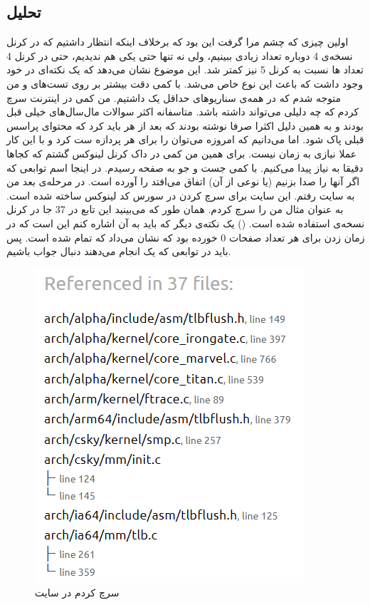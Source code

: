 \subsection{تحلیل}
اولین چیزی که چشم مرا گرفت این بود که برخلاف اینکه انتظار داشتیم که در کرنل نسخه‌ی 4 دوباره تعداد زیادی
ببینیم، ولی نه تنها حتی یکی هم ندیدیم، حتی در کرنل 4 تعداد
ها
نسبت به کرنل 5 نیز کمتر شد. این موضوع نشان می‌دهد که یک نکته‌ای در خود
وجود داشت که باعث این نوع
خاص می‌شد. با کمی دقت بیشتر بر روی تست‌های
 و 
من متوجه شدم که در همه‌ی سناریو‌های
حداقل یک
داشتیم. من کمی در اینترنت سرچ کردم که چه دلیلی می‌تواند داشته باشد. متاسفانه اکثر سوالات مال‌سال‌های
خیلی قبل بودند و به همین دلیل اکثرا صرفا نوشته بودند که بعد از هر
باید
کرد که محتوای پراسس قبلی پاک شود. اما می‌دانیم که امروزه می‌توان
را برای هر پردازه ست کرد و با این کار عملا نیازی به
زمان
نیست. برای همین من کمی در داک کرنل لینوکس گشتم که کجا‌ها دقیقا به
نیاز پیدا می‌کنیم. با کمی جست و جو به
صفحه رسیدم. در اینجا اسم توابعی که اگر آنها را صدا بزنیم
(یا نوعی از آن)
اتفاق می‌افتد را آورده است. در مرحله‌ی بعد من به سایت
رفتم. این سایت برای سرچ کردن در سورس کد لینوکس ساخته شده است. به عنوان مثال من
را سرچ کردم. همان طور که می‌بینید این تابع در 37 جا در کرنل نسخه‌ی
استفاده شده است.
()
یک نکته‌ی دیگر که باید به آن اشاره کنم این است که در زمان زدن
برای هر
تعداد صفحات 0 خورده بود که نشان می‌داد که تمام
شده است. پس باید در توابعی که یک
انجام می‌دهند دنبال جواب باشیم.
\begin{figure}[H]
    \centering
    \includegraphics[scale=0.6]{pictures/mysql/results/bootlin.png}
    \caption{سرچ کردم  در سایت }
    \label{fig:mysql:results:bootlin}
\end{figure}
